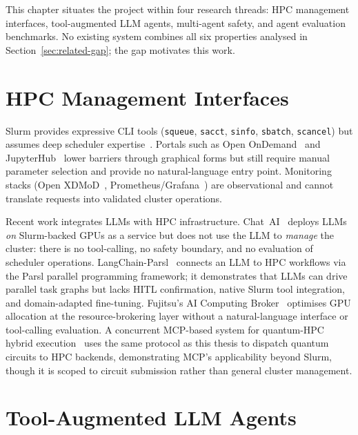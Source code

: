 \label{sec:related-works-compact}

This chapter situates the project within four research threads: HPC management interfaces, tool-augmented LLM agents, multi-agent safety, and agent evaluation benchmarks. No existing system combines all six properties analysed in Section~\ref{sec:related-gap}; the gap motivates this work.

\section{HPC Management Interfaces}

Slurm provides expressive CLI tools (\texttt{squeue}, \texttt{sacct}, \texttt{sinfo}, \texttt{sbatch}, \texttt{scancel}) but assumes deep scheduler expertise~\cite{yoo2003slurm, slurm2024docs}. Portals such as Open OnDemand~\cite{hudak2018openondemand} and JupyterHub~\cite{jupyterhub2024} lower barriers through graphical forms but still require manual parameter selection and provide no natural-language entry point. Monitoring stacks (Open XDMoD~\cite{palmer2015openxdmod}, Prometheus/Grafana~\cite{prometheus2024,grafana2024}) are observational and cannot translate requests into validated cluster operations.

Recent work integrates LLMs with HPC infrastructure. Chat~AI~\cite{doosthosseini2024chatai} deploys LLMs \emph{on} Slurm-backed GPUs as a service but does not use the LLM to \emph{manage} the cluster: there is no tool-calling, no safety boundary, and no evaluation of scheduler operations. LangChain-Parsl~\cite{langchainparsl2025} connects an LLM to HPC workflows via the Parsl parallel programming framework; it demonstrates that LLMs can drive parallel task graphs but lacks HITL confirmation, native Slurm tool integration, and domain-adapted fine-tuning. Fujitsu's AI Computing Broker~\cite{fujitsu2025acb} optimises GPU allocation at the resource-brokering layer without a natural-language interface or tool-calling evaluation. A concurrent MCP-based system for quantum-HPC hybrid execution~\cite{shiraishi2026mcpquantum} uses the same protocol as this thesis to dispatch quantum circuits to HPC backends, demonstrating MCP's applicability beyond Slurm, though it is scoped to circuit submission rather than general cluster management.

\section{Tool-Augmented LLM Agents}

